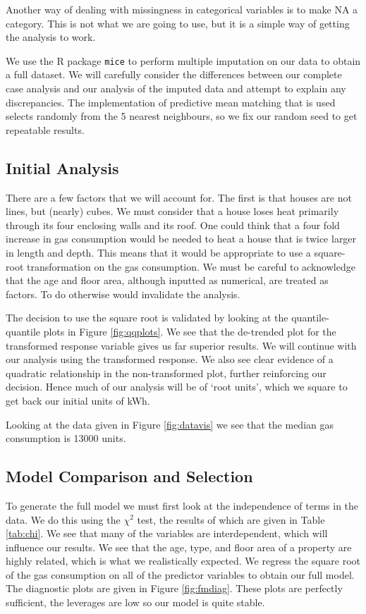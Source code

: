 \documentclass[9pt]{extarticle}
\begin{document}
Another way of dealing with missingness in categorical variables is to make NA a category. This is not what we are going to use, but it is a simple way of getting the analysis to work.

We use the R package \texttt{mice} to perform multiple imputation on our data to obtain a full dataset. We will carefully consider the differences between our complete case analysis and our analysis of the imputed data and attempt to explain any discrepancies. The implementation of predictive mean matching that is used selects randomly from the 5 nearest neighbours, so we fix our random seed to get repeatable results.

\subsection{Initial Analysis}

There are a few factors that we will account for. The first is that houses are not lines, but (nearly) cubes. We must consider that a house loses heat primarily through its four enclosing walls and its roof. One could think that a four fold increase in gas consumption would be needed to heat a house that is twice larger in length and depth. This means that it would be appropriate to use a square-root transformation on the gas consumption. We must be careful to acknowledge that the age and floor area, although inputted as numerical, are treated as factors. To do otherwise would invalidate the analysis.

The decision to use the square root is validated by looking at the quantile-quantile plots in Figure \ref{fig:qqplots}. We see that the de-trended plot for the transformed response variable gives us far superior results. We will continue with our analysis using the transformed response. We also see clear evidence of a quadratic relationship in the non-transformed plot, further reinforcing our decision. Hence much of our analysis will be of `root units', which we square to get back our initial units of kWh.

Looking at the data given in Figure \ref{fig:datavis} we see that the median gas consumption is 13000 units. 

\subsection{Model Comparison and Selection}
To generate the full model we must first look at the independence of terms in the data. We do this using the $\chi^2$ test, the results of which are given in Table \ref{tab:chi}. We see that many of the variables are interdependent, which will influence our results. We see that the age, type, and floor area of a property are highly related, which is what we realistically expected. We regress the square root of the gas consumption on all of the predictor variables to obtain our full model. The diagnostic plots are given in Figure \ref{fig:fmdiag}. These plots are perfectly sufficient, the leverages are low so our model is quite stable. 
\end{document}
